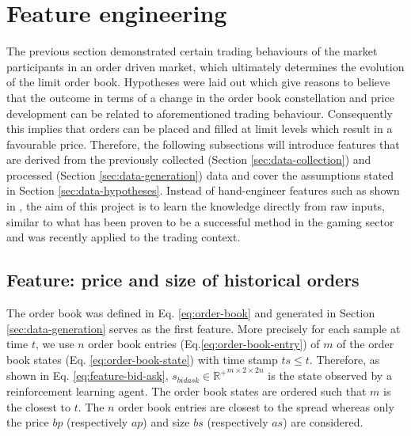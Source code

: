 \section{Feature engineering}
\label{sec:feature-engineering}
The previous section demonstrated certain trading behaviours of the market participants in an order driven market, which ultimately determines the evolution of the limit order book. 
Hypotheses were laid out which give reasons to believe that the outcome in terms of a change in the order book constellation and price development can be related to aforementioned trading behaviour.
Consequently this implies that orders can be placed and filled at limit levels which result in a favourable price.
Therefore, the following subsections will introduce features that are derived from the previously collected (Section \ref{sec:data-collection}) and processed (Section \ref{sec:data-generation}) data and cover the assumptions stated in Section \ref{sec:data-hypotheses}.
Instead of hand-engineer features such as shown in \cite{nevmyvaka2006reinforcement, hwangdeep, fletcher2010multiple}, the aim of this project is to learn the knowledge directly from raw inputs, similar to what has been proven to be a successful method in the gaming sector\cite{mnih2013playing} and was recently applied to the trading context\cite{lu2017agent}.

\subsection{Feature: price and size of historical orders}
The order book was defined in Eq. \ref{eq:order-book} and generated in Section \ref{sec:data-generation} serves as the first feature.
More precisely for each sample at time $t$, we use $n$ order book entries (Eq.\ref{eq:order-book-entry}) of $m$ of the order book states (Eq. \ref{eq:order-book-state}) with time stamp $ts \le t$.
Therefore, as shown in Eq. \ref{eq:feature-bid-ask}, $s_{bidask} \in \mathbb{R^+}^{m\times2\times2n}$ is the state observed by a reinforcement learning agent.
The order book states are ordered such that $m$ is the closest to $t$.
The $n$ order book entries are closest to the spread whereas only the price $bp$ (respectively $ap$) and size $bs$ (respectively $as$) are considered.

